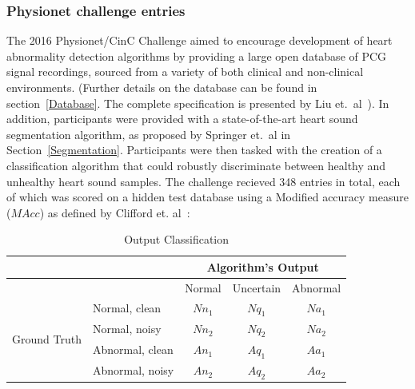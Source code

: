 \documentclass[titlepage, 12pt]{scrartcl} \usepackage{enumitem}
\begin{document}
\subsubsection{Physionet challenge entries}\label{ChallengeEnt}
\doublespacing
The 2016 Physionet/CinC Challenge aimed to encourage development of heart
abnormality detection algorithms by providing a large open database of PCG
signal recordings, sourced from a variety of both clinical and non-clinical
environments. (Further details on the database can be found in
section~\ref{Database}. The complete specification is presented by Liu et.\
al~\parencite{Liu2016}). In addition, participants were provided with a
state-of-the-art heart sound segmentation algorithm, as proposed by Springer
et.\ al in Section~\ref{Segmentation}. Participants were then tasked with the
creation of a classification algorithm that could robustly discriminate between
healthy and unhealthy heart sound samples. The challenge recieved 348 entries
in total, each of which was scored on a hidden test database
using a Modified accuracy measure ($MAcc$) as defined by Clifford et.
al~\parencite{Clifford2016}:
\begin{table}[htbp]
\centering
\caption{Output Classification}
\label{OutputClassification}
\doublespacing
\begin{tabular}{llccc}
\hline
                              &                 & \multicolumn{3}{c}{Algorithm's Output}                                                    \\ \hline
                              &                 & \multicolumn{1}{l}{Normal} & \multicolumn{1}{l}{Uncertain} & \multicolumn{1}{l}{Abnormal} \\
\multirow{4}{*}{Ground Truth} & Normal, clean   & $Nn_1$                     & $Nq_1$                        & $Na_1$                       \\
                              & Normal, noisy   & $Nn_2$                     & $Nq_2$                        & $Na_2$                       \\
                              & Abnormal, clean & $An_1$                     & $Aq_1$                        & $Aa_1$                       \\
                              & Abnormal, noisy & $An_2$                     & $Aq_2$                        & $Aa_2$                       \\ \hline
\end{tabular}
\end{table}
\end{document}
